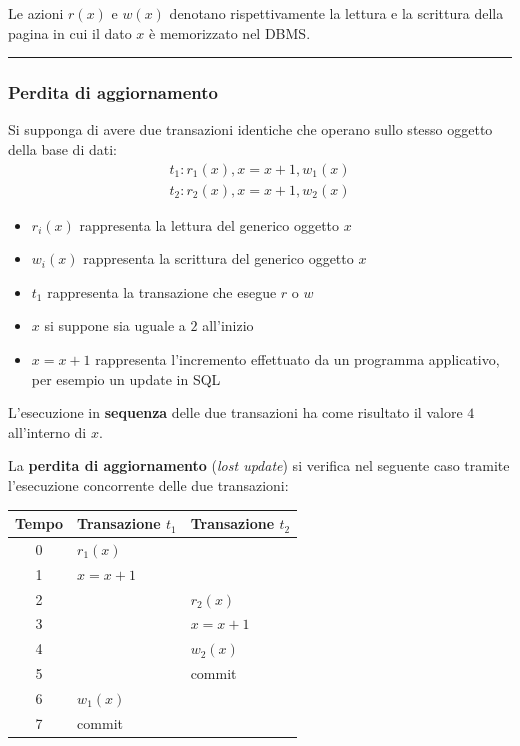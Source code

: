 \documentclass[a4paper]{article}
\newcommand{\longline}{\noindent\rule{\textwidth}{0.4pt}}
\begin{document}
	Le azioni $r\left(x\right)$ e $w\left(x\right)$ denotano rispettivamente la lettura e la scrittura della pagina in cui il dato $x$ è memorizzato nel DBMS.
	
	\longline
	
	\subsubsection{Perdita di aggiornamento}\label{par: perdita di aggiornamento}
	
	Si supponga di avere due transazioni identiche che operano sullo stesso oggetto della base di dati:
	\begin{gather*}
		t_{1} : r_{1}\left(x\right), x = x + 1, w_{1}\left(x\right) \\
		t_{2} : r_{2}\left(x\right), x = x + 1, w_{2}\left(x\right)
	\end{gather*}
	\begin{itemize}
		\item $r_{i}\left(x\right)$ rappresenta la lettura del generico oggetto $x$
		\item $w_{i}\left(x\right)$ rappresenta la scrittura del generico oggetto $x$
		\item $t_{1}$ rappresenta la transazione che esegue $r$ o $w$
		\item $x$ si suppone sia uguale a $2$ all'inizio
		\item $x = x+1$ rappresenta l'incremento effettuato da un programma applicativo, per esempio un \textsf{update} in SQL
	\end{itemize}
	L'esecuzione in \textbf{sequenza} delle due transazioni ha come risultato il valore $4$ all'interno di $x$.\newline
	
	\noindent
	La \textcolor{Red3}{\textbf{perdita di aggiornamento}} (\emph{lost update}) si verifica nel seguente caso tramite l'esecuzione concorrente delle due transazioni:
	\begin{table}[!htbp]
		\centering
		\begin{tabular}{@{} c l l @{}}
			\toprule
			Tempo & Transazione $t_{1}$ & Transazione $t_{2}$ \\
			\midrule
			0	& $r_{1}\left(x\right)$			& \\
			1	& $x = x + 1$					& \\
			2	&								& $r_{2}\left(x\right)$ \\
			3	&								& $x = x + 1$ \\
			4	&								& $w_{2}\left(x\right)$ \\
			5	&								& \textsf{commit} \\
			6	& $w_{1}\left(x\right)$			& \\
			7	& \textsf{commit}				& \\
			\bottomrule
		\end{tabular}
	\end{table}
\end{document}
